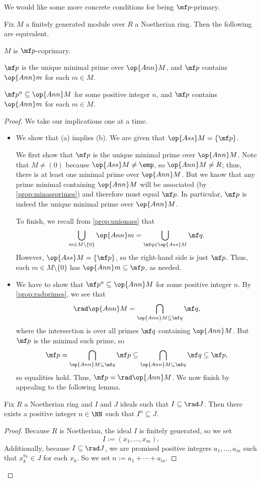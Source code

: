 We would like some more concrete conditions for being $\mf p$-primary.
\begin{proposition}
	Fix $M$ a finitely generated module over $R$ a Noetherian ring. Then the following are equivalent.
	\begin{listalph}
		\item $M$ is $\mf p$-coprimary.
		\item $\mf p$ is the unique minimal prime over $\op{Ann}M$, and $\mf p$ contains $\op{Ann}m$ for each $m\in M$. %
		\item $\mf p^n\subseteq\op{Ann}M$ for some positive integer $n$, and $\mf p$ contains $\op{Ann}m$ for each $m\in M$.
	\end{listalph}
\end{proposition}
\begin{proof}
	We take our implications one at a time.
	\begin{itemize}
		\item We show that (a) implies (b). We are given that $\op{Ass}M=\{\mf p\}$.
		
		We first show that $\mf p$ is the unique minimal prime over $\op{Ann}M$. Note that $M\ne(0)$ because $\op{Ass}M\ne\emp$, so $\op{Ann}M\ne R$; thus, there is at least one minimal prime over $\op{Ann}M$. But we know that any prime minimal containing $\op{Ann}M$ will be associated (by \autoref{prop:minassprimes}) and therefore must equal $\mf p$. In particular, $\mf p$ is indeed the unique minimal prime over $\op{Ann}M$.

		To finish, we recall from \autoref{prop:unionass} that
		\[\bigcup_{m\in M\setminus\{0\}}\op{Ann}m=\bigcup_{\mf q\in\op{Ass}M}\mf q.\]
		However, $\op{Ass}M=\{\mf p\}$, so the right-hand side is just $\mf p$. Thus, each $m\in M\setminus\{0\}$ has $\op{Ann}m\subseteq\mf p$, as needed.

		\item We have to show that $\mf p^n\subseteq\op{Ann}M$ for some positive integer $n$. By \autoref{prop:radprimes}, we see that
		\[\rad\op{Ann}M=\bigcap_{\op{Ann}M\subseteq\mf q}\mf q,\]
		where the intersection is over all primes $\mf q$ containing $\op{Ann}M$. But $\mf p$ is the minimal such prime, so
		\[\mf p=\bigcap_{\op{Ann}M\subseteq\mf q}\mf p\subseteq\bigcap_{\op{Ann}M\subseteq\mf q}\mf q\subseteq\mf p,\]
		so equalities hold. Thus, $\mf p=\rad\op{Ann}M$. We now finish by appealing to the following lemma.
	\end{itemize}
	\begin{lemma}
		Fix $R$ a Noetherian ring and $I$ and $J$ ideals such that $I\subseteq\rad J$. Then there exists a positive integer $n\in\NN$ such that $I^n\subseteq J$.
	\end{lemma}
	\begin{proof}
		Because $R$ is Noetherian, the ideal $I$ is finitely generated, so we set
		\[I:=(x_1,\ldots,x_m).\]
		Additionally, because $I\subseteq\rad J$, we are promised positive integers $a_1,\ldots,a_m$ such that $x_k^{a_k}\in J$ for each $x_k$. So we set $n:=a_1+\cdots+a_m$.
		

\end{proof}
\end{proof}
